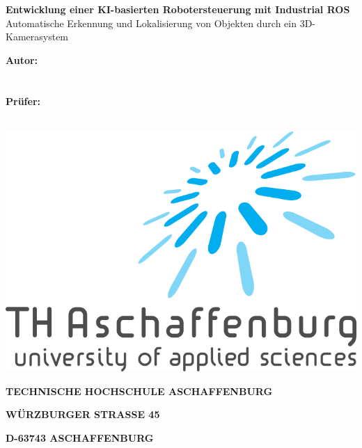 \maketitle
{}
\newpage
\thispagestyle{empty}
\begin{center}
\makeatletter
\textbf{Entwicklung einer KI-basierten Robotersteuerung mit Industrial ROS}
Automatische Erkennung und Lokalisierung von Objekten durch ein 3D-Kamerasystem
\makeatother
\end{center}
\begin{flushleft}
   \vspace{10em}
   \textbf{Autor:}\\
   \makeatletter
   \@author\\
   \@matrikelnummer\\
   \makeatother
   \vspace{5em}
   \textbf{Prüfer:}\\
   \makeatletter
   \@erstpruefer\\
   \makeatother
   \vspace{10em}
   \begin{minipage}[b]{0.4\textwidth}
       \includegraphics[scale=0.15]{Bilder/thab_logo.png}
   \end{minipage}
   \par
   \large{\MakeUppercase{\textbf{Technische Hochschule Aschaffenburg}}} \par
   \makeatletter
   \large{\MakeUppercase{\textbf{\@faculty}}} \par
   \makeatother
   \large{\MakeUppercase{\textbf{Würzburger Straße 45}}} \par
   \large{\MakeUppercase{\textbf{D-63743 Aschaffenburg}}} \par
    \vfill
\end{flushleft}

